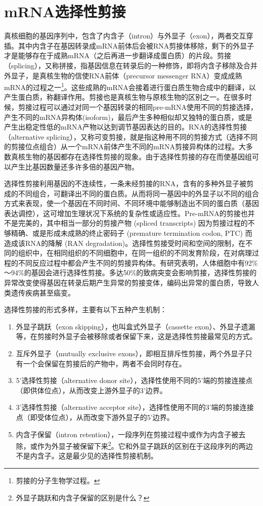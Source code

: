 \documentclass[11pt,a4paper,twoside]{book}
\begin{document}
\section{mRNA选择性剪接}
真核细胞的基因序列中，包含了内含子（intron）与外显子（exon），两者交互穿插。其中内含子在基因转录成mRNA前体后会被RNA剪接体移除，剩下的外显子才是能够存在于成熟mRNA（之后再进一步翻译成蛋白质）的片段。剪接（splicing），又称拼接，指基因信息在转录后的一种修饰，即将内含子移除及合并外显子，是真核生物的信使RNA前体（precursor messenger RNA）变成成熟mRNA的过程之一\footnote{剪接的分子生物学过程。}。这些成熟的mRNA会接着进行蛋白质生物合成中的翻译，以产生蛋白质，称翻译作用。剪接也是真核生物与原核生物的区别之一。在很多时候，剪接过程可以通过对同一个基因转录的相同pre-mRNA使用不同的剪接选择，产生不同的mRNA异构体(isoform)，最后产生多种相似却又独特的蛋白质，或是产生出稳定性低的mRNA产物以达到调节基因表达的目的。RNA的选择性剪接（alternative splicing），又称可变剪接，就是指这种用不同的剪接方式（选择不同的剪接位点组合）从一个mRNA前体产生不同的mRNA剪接异构体的过程。大多数真核生物的基因都存在选择性剪接的现象。由于选择性剪接的存在而使基因组可以产生比基因数量还多许多倍的基因产物。

选择性剪接利用基因的不连续性，一条未经剪接的RNA，含有的多种外显子被剪成的不同组合，可翻译出不同的蛋白质。从而将同一基因中的外显子以不同的组合方式来表现，使一个基因在不同时间、不同环境中能够制造出不同的蛋白质（基因表达调控），这可增加生理状况下系统的复杂性或适应性。Pre-mRNA的剪接也并不是完美的，其中相当一部分的剪接产物 (spliced transcripts) 因为剪接过程的不够精确、或是形成未成熟的终止密码子 (premature termination codon, PTC) 而造成该RNA的降解 (RAN degradation)。选择性剪接受时间和空间的限制，在不同的组织中，在相同组织的不同细胞中，在同一组织的不同发育阶段，在对病理过程的不同反应过程中都会产生不同的剪接异构体。有研究表明，人体细胞中有92\%～94\%的基因会进行选择性剪接。多达50\%的致病突变会影响剪接，选择性剪接的异常改变使得基因在转录后期产生异常的剪接变体，编码出异常的蛋白质，导致人类遗传疾病甚至癌变。

选择性剪接的形式多样，主要有以下五种产生机制：
\begin{enumerate}
  \item 外显子跳跃（exon skipping），也叫盒式外显子（cassette exon）、外显子遗漏等，在剪接时外显子会被移除或者保留下来，这是选择性剪接最常见的方式。
  \item 互斥外显子（mutually exclusive exons），即相互排斥性剪接，两个外显子只有一个会保留在剪接后的产物中，两者不会同时存在。
  \item 5'选择性剪接（alternative donor site），选择性使用不同的5'端的剪接连接点（即供体位点），从而改变上游外显子的3'边界。
  \item 3'选择性剪接（alternative acceptor site），选择性使用不同的3'端的剪接连接点（即受体位点），从而改变下游外显子的5'边界。
  \item 内含子保留（intron retention），一段序列在剪接过程中或作为内含子被去除，或作为外显子被保留下来\footnote{外显子跳跃和内含子保留的区别是什么？}。它和外显子跳跃的区别在于这段序列的两边不是内含子。这是最少见的选择性剪接机制。
\end{enumerate}
\end{document}
